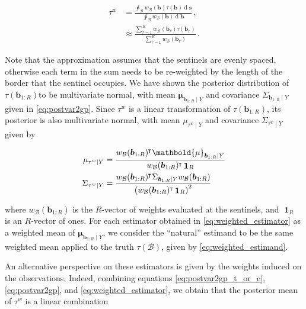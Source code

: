 \documentclass[letter]{article}
\let\originalleft\left
\let\originalright\right
\def\left#1{\mathopen{}\originalleft#1}
\def\right#1{\originalright#1\mathclose{}}
\DeclarePairedDelimiter{\parenthesis}{\lparen}{\rparen}
\newcommand{\del}[1]{\parenthesis*{#1}}
\DeclareMathOperator{\dif}{d}
\DeclareMathOperator{\ones}{\mathbf{1}}
\newcommand*{\trans}{^{\mkern-1.5mu\intercal}}
\newcommand{\svec}{\mathbold{s}}
\newcommand{\muvec}{\mathbold{\mu}}
\newcommand{\border}{\mathcal{B}}
\newcommand{\sentinel}{\bm{b}}
\newcommand{\numsent}{R}
\newcommand{\sentinels}{\sentinel_{1:\numsent}}
\newcommand{\isent}{r}
\newcommand{\tauw}{\tau^{w}}
\newcommand{\eqlabel}[1]{\label{#1}}
\newcommand{\weightb}{w_{\border}}
\begin{document}
\begin{equation}\begin{split}
    \tauw &= \frac{\oint_\border \left. \weightb(\sentinel) \tau(\sentinel) \dif \svec \right.}
                  {\oint_\border \left. \weightb(\sentinel) \dif \sentinel \right.}\,,\\
          &\approx \frac{\sum_{\isent=1}^\numsent \weightb(\sentinel_\isent) \tau(\sentinel_\isent)}
                       {\sum_{\isent=1}^\numsent \weightb(\sentinel_\isent) } \,.
\end{split}
\eqlabel{eq:weighted_estimand}
\end{equation}

Note that the approximation assumes that the sentinels are evenly spaced, otherwise each term in the sum needs to be re-weighted by the length of the border that the sentinel occupies.
We have shown the posterior distribution of \(\tau(\sentinels)\)to be multivariate normal, with mean \(\muvec_{\sentinels \mid Y}\) and covariance \(\Sigma_{\sentinels \mid Y}\) given in \eqref{eq:postvar2gp}.
Since \(\tauw\) is a linear transformation of \(\tau(\sentinels)\), its posterior is also multivariate normal, with mean \(\mu_{\tauw \mid Y}\) and covariance \(\Sigma_{\tauw \mid Y}\) given by

\begin{equation}\begin{split}
    \mu_{\tauw \mid Y} &= \frac{\weightb(\sentinels)\trans \muvec_{\sentinels \mid Y}}
                               {\weightb(\sentinels)\trans  \ones_\numsent} \\
    \Sigma_{\tauw \mid Y} &= \frac{\weightb(\sentinels)\trans \Sigma_{\sentinels \mid Y} \weightb(\sentinels)}
                                  { \del{\weightb(\sentinels)\trans  \ones_\numsent }^2 }\\
\end{split}
\eqlabel{eq:weighted_estimator}
\end{equation}

where \(\weightb(\sentinels)\) is the \(\numsent\)-vector of weights evaluated at the sentinels, and \(\ones_\numsent\) is an \(\numsent\)-vector of ones.
For each estimator obtained in \eqref{eq:weighted_estimator} as a weighted mean of \(\muvec_{\sentinels \mid Y}\), we consider the ``natural'' estimand to be the same weighted mean applied to the truth \(\tau(\border)\), given by \eqref{eq:weighted_estimand}.

An alternative perspective on these estimators is given by the weights induced on the observations.
Indeed, combining equations \eqref{eq:postvar2gp_t_or_c}, \eqref{eq:postvar2gp}, and \eqref{eq:weighted_estimator}, we obtain that the posterior mean of \(\tauw\) is a linear combination
\end{document}
